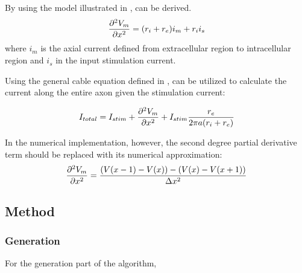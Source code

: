 \documentclass{IEEEtran}
\begin{document}
By using the model illustrated in ,  can be derived. 
\begin{equation}
    \pdv[2]{V_m}{x} = (r_i+r_e) i_m + r_i i_s \label{eqn:cable}
\end{equation}
where $i_m$ is the axial current defined from extracellular region to intracellular region and $i_s$ in the input stimulation current. 

Using the general cable equation defined in ,  can be utilized to calculate the current along the entire axon given the stimulation current: 

\begin{equation}
    I_{total} = I_{stim} + \pdv[2]{V_m}{x} + I_{stim} \frac{r_e}{2\pi a (r_i+r_e)} \label{eqn:num} 
\end{equation}

In the numerical implementation, however, the second degree partial derivative term should be replaced with its numerical approximation: 
\begin{equation}
    \pdv[2]{V_m}{x} = \frac{(V(x-1)-V(x))-(V(x)-V(x+1))}{\Delta x^2}
\end{equation}

\subsection{Method}
\subsubsection{Generation}

For the generation part of the algorithm, 
\end{document}
